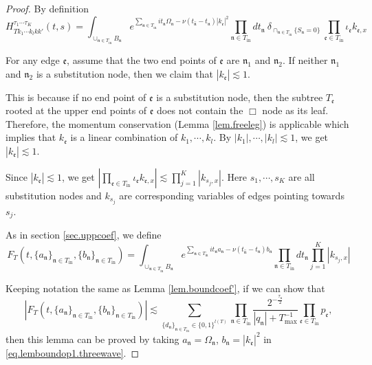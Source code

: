 \begin{proof} By definition
\begin{equation}
H^{\tau_1\cdots \tau_{K}}_{Tk_1\cdots k_{l}kk'}(t,s)=\int_{\cup_{\mathfrak{n}\in T_{\text{in}}} B_{\mathfrak{n}}} e^{\sum_{\mathfrak{n}\in T_{\text{in}}} it_{\mathfrak{n}}\Omega_{\mathfrak{n}}-\nu(t_{\widehat{\mathfrak{n}}}-t_{\mathfrak{n}})|k_{\mathfrak{e}}|^2}  %
\prod_{\mathfrak{n}\in T_{\text{in}}} dt_{\mathfrak{n}} 
\ \delta_{\cap_{\mathfrak{n}\in T_{\text{in}}} \{S_{\mathfrak{n}}=0\}}\ \prod_{\mathfrak{e}\in T_{\text{in}}}\iota_{\mathfrak{e}}k_{\mathfrak{e},x}
\end{equation}

For any edge $\mathfrak{e}$, assume that the two end points of $\mathfrak{e}$ are $\mathfrak{n}_1$ and $\mathfrak{n}_2$. If neither $\mathfrak{n}_1$ and $\mathfrak{n}_2$ is a substitution node, then we claim that $|k_{\mathfrak{e}}|\lesssim 1$. 

This is because if no end point of $\mathfrak{e}$ is a substitution node, then the subtree $T_{\mathfrak{e}}$ rooted at the upper end points of $\mathfrak{e}$ does not contain the $\Box$ node as its leaf. Therefore, the momentum conservation (Lemma \ref{lem.freeleg}) is applicable which implies that $k_{\mathfrak{e}}$ is a linear combination of $k_1,\cdots,k_{l}$. By $|k_1|, \cdots, |k_{l}|\lesssim 1$, we get $|k_{\mathfrak{e}}|\lesssim 1$. 

Since $|k_{\mathfrak{e}}|\lesssim 1$, we get $\left|\prod_{\mathfrak{e}\in T_{\text{in}}}\iota_{\mathfrak{e}}k_{\mathfrak{e},x}\right|\lesssim \prod^K_{j=1}|k_{s_j,x}|$. Here $s_1, \cdots, s_K$ are all substitution nodes and $k_{s_j}$ are corresponding variables of edges pointing towards $s_j$.


As in section \ref{sec.uppcoef}, we define 
\begin{equation}\label{eq.defF_Toperator.threewave}
F_{T}(t,\{a_{\mathfrak{n}}\}_{\mathfrak{n}\in T_{\text{in}}},\{b_{\mathfrak{n}}\}_{\mathfrak{n}\in T_{\text{in}}})=\int_{\cup_{\mathfrak{n}\in T_{\text{in}}} B_{\mathfrak{n}}} e^{\sum_{\mathfrak{n}\in T_{\text{in}}} it_{\mathfrak{n}} a_{\mathfrak{n}} - \nu(t_{\widehat{\mathfrak{n}}}-t_{\mathfrak{n}})b_{\mathfrak{n}}} \prod_{\mathfrak{n}\in T_{\text{in}}} dt_{\mathfrak{n}} \prod^K_{j=1}|k_{s_j,x}|
\end{equation}

Keeping notation the same as Lemma \ref{lem.boundcoef'}, if we can show that
\begin{equation}\label{eq.lemboundop1.threewave}
    |F_{T}(t,\{a_{\mathfrak{n}}\}_{\mathfrak{n}\in T_{\text{in}}},\{b_{\mathfrak{n}}\}_{\mathfrak{n}\in T_{\text{in}}})|\lesssim\sum_{\{d_{\mathfrak{n}}\}_{\mathfrak{n}\in T_{\text{in}}}\in\{0,1\}^{l(T)}}\prod_{\mathfrak{n}\in T_{\text{in}}}\frac{2^{-\frac{\tau_{\mathfrak{n}}}{2}}}{|q_{\mathfrak{n}}|+T^{-1}_{\text{max}}}\prod_{\mathfrak{e}\in T_{\text{in}}} p_{\mathfrak{e}}
,
\end{equation}
then this lemma can be proved by taking $a_{\mathfrak{n}}=\Omega_{\mathfrak{n}}$, $b_{\mathfrak{n}}=|k_{\mathfrak{e}}|^2$ in \eqref{eq.lemboundop1.threewave}.


\end{proof}
